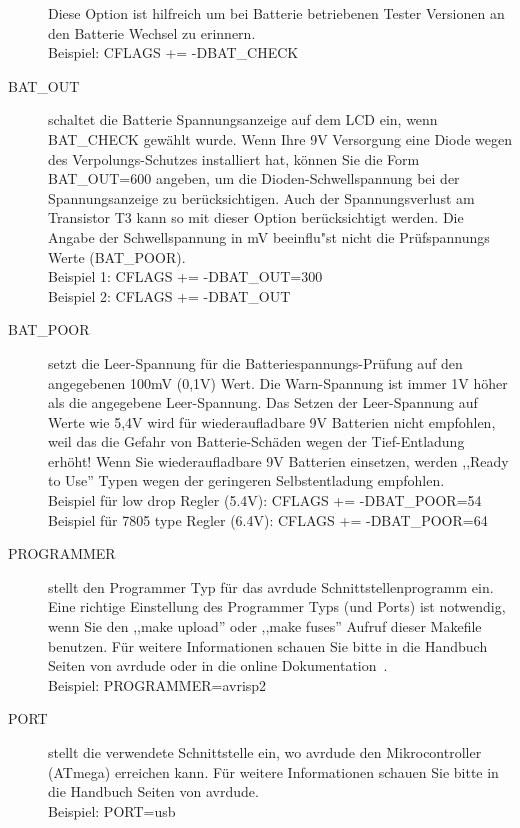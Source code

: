 \begin{description}
Diese Option ist hilfreich um bei Batterie betriebenen Tester Versionen an den Batterie Wechsel zu erinnern.\\
Beispiel: CFLAGS += -DBAT\_CHECK
  \item[BAT\_OUT] schaltet die Batterie Spannungsanzeige auf dem LCD ein, wenn BAT\_CHECK gew\"ahlt wurde.
 Wenn Ihre 9V Versorgung eine Diode wegen des Verpolungs-Schutzes installiert hat, k\"onnen Sie 
die Form BAT\_OUT=600 angeben, um die Dioden-Schwellspannung 
bei der Spannungsanzeige zu ber\"ucksichtigen.
Auch der Spannungsverlust am Transistor T3 kann so mit dieser Option ber\"ucksichtigt werden.
Die Angabe der Schwellspannung in mV beeinflu"st nicht die Pr\"uf\-span\-nungs Werte (BAT\_POOR).\\
Beispiel 1: CFLAGS += -DBAT\_OUT=300 \\
Beispiel 2: CFLAGS += -DBAT\_OUT
  \item[BAT\_POOR] setzt die Leer-Spannung f\"ur die Batteriespannungs-Pr\"ufung auf den angegebenen 100mV (0,1V) Wert.
Die Warn-Spannung ist immer 1V h\"oher als die angegebene Leer-Spannung.
Das Setzen der Leer-Spannung auf Werte wie 5,4V wird f\"ur wiederaufladbare 9V Batterien nicht empfohlen,
weil das die Gefahr von Batterie-Sch\"aden wegen der Tief-Entladung erh\"oht!
Wenn Sie wiederaufladbare 9V Batterien einsetzen, werden ,,Ready to Use'' Typen wegen der geringeren Selbstentladung empfohlen.\\
Beispiel f\"ur low drop Regler (5.4V): CFLAGS += -DBAT\_POOR=54 \\
Beispiel f\"ur 7805 type Regler (6.4V): CFLAGS += -DBAT\_POOR=64
  \item[PROGRAMMER] stellt den Programmer Typ f\"ur das avrdude Schnittstellenprogramm ein.
Eine richtige Einstellung des Programmer Typs (und Ports) ist notwendig, wenn Sie den ,,make upload'' oder
,,make fuses'' Aufruf dieser Makefile benutzen.
F\"ur weitere Informationen schauen Sie bitte in die Handbuch Seiten von avrdude oder in die online Dokumentation~\cite{avrdude}.\\
Beispiel: PROGRAMMER=avrisp2
  \item[PORT] stellt die verwendete Schnittstelle ein, wo avrdude den Mikrocontroller (ATmega) erreichen kann.
F\"ur weitere Informationen schauen Sie bitte in die Handbuch Seiten von avrdude.\\
Beispiel: PORT=usb

\end{description}

